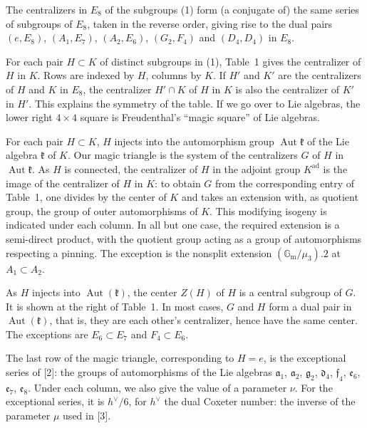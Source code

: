 \documentclass[11pt,a4paper]{article}
\DeclareMathOperator{\Aut}{Aut}
\begin{document}
\medskip
\noindent
The centralizers in $E_{8}$ of the subgroups (1) form (a conjugate of) the same series of subgroups of $E_{8}$, taken in the reverse order, giving rise to the dual pairs $(e, E_{8})$, $(A_{1}, E_{7})$, $(A_{2}, E_{6})$, $(G_{2}, F_{4})$ and $(D_{4}, D_{4})$ in $E_{8}$.

For each pair $H \subset K$ of distinct subgroups in (1), Table~1 gives the centralizer of $H$ in $K$. Rows are indexed by $H$, columns by $K$. If $H'$ and $K'$ are the centralizers of $H$ and $K$ in $E_{8}$, the centralizer $H' \cap K$ of $H$ in $K$ is also the centralizer of $K'$ in $H'$. This explains the symmetry of the table. If we go over to Lie algebras, the lower right $4 \times 4$ square is Freudenthal's ``magic square'' of Lie algebras.

For each pair $H \subset K$, $H$ injects into the automorphism group $\Aut \mathfrak{k}$ of the Lie algebra $\mathfrak{k}$ of $K$. Our magic triangle is the system of the centralizers $G$ of $H$ in $\Aut \mathfrak{k}$. As $H$ is connected, the centralizer of $H$ in the adjoint group $K^{\mathrm{ad}}$ is the image of the centralizer of $H$ in $K$: to obtain $G$ from the corresponding entry of Table~1, one divides by the center of $K$ and takes an extension with, as quotient group, the group of outer automorphisms of $K$. This modifying isogeny is indicated under each column. In all but one case, the required extension is a semi-direct product, with the quotient group acting as a group of automorphisms respecting a pinning. The exception is the nonsplit extension $(\mathbb{G}_{\mathrm{m}}/\mu_{3}).2$ at $A_{1} \subset A_{2}$.

As $H$ injects into $\Aut(\mathfrak{k})$, the center $Z(H)$ of $H$ is a central subgroup of $G$. It is shown at the right of Table~1. In most cases, $G$ and $H$ form a dual pair in $\Aut(\mathfrak{k})$, that is, they are each other's centralizer, hence have the same center. The exceptions are $E_{6} \subset E_{7}$ and $F_{4} \subset E_{6}$.

The last row of the magic triangle, corresponding to $H = e$, is the exceptional series of [2]: the groups of automorphisms of the Lie algebras $\mathfrak{a}_{1}$, $\mathfrak{a}_{2}$, $\mathfrak{g}_{2}$, $\mathfrak{d}_{4}$, $\mathfrak{f}_{4}$, $\mathfrak{e}_{6}$, $\mathfrak{e}_{7}$, $\mathfrak{e}_{8}$. Under each column, we also give the value of a parameter $\nu$. For the exceptional series, it is $h^{\vee}/6$, for $h^{\vee}$ the dual Coxeter number: the inverse of the parameter $\mu$ used in [3].
\end{document}
